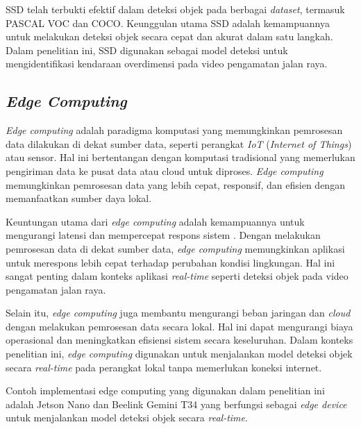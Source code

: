 SSD telah terbukti efektif dalam deteksi objek pada berbagai \emph{dataset}, termasuk PASCAL VOC dan COCO. Keunggulan utama SSD adalah kemampuannya untuk melakukan deteksi objek secara cepat dan akurat dalam satu langkah. Dalam penelitian ini, SSD digunakan sebagai model deteksi untuk mengidentifikasi kendaraan overdimensi pada video pengamatan jalan raya.

\subsection{\emph{Edge Computing}}

\emph{Edge computing} adalah paradigma komputasi yang memungkinkan pemrosesan data dilakukan di dekat sumber data, seperti perangkat \emph{IoT} (\emph{Internet of Things}) atau sensor. Hal ini bertentangan dengan komputasi tradisional yang memerlukan pengiriman data ke pusat data atau cloud untuk diproses. \emph{Edge computing} memungkinkan pemrosesan data yang lebih cepat, responsif, dan efisien dengan memanfaatkan sumber daya lokal.

Keuntungan utama dari \emph{edge computing} adalah kemampuannya untuk mengurangi latensi dan mempercepat respons sistem \parencite*{aws2024}. Dengan melakukan pemrosesan data di dekat sumber data, \emph{edge computing} memungkinkan aplikasi untuk merespons lebih cepat terhadap perubahan kondisi lingkungan. Hal ini sangat penting dalam konteks aplikasi \emph{real-time} seperti deteksi objek pada video pengamatan jalan raya.

Selain itu, \emph{edge computing} juga membantu mengurangi beban jaringan dan \emph{cloud} dengan melakukan pemrosesan data secara lokal. Hal ini dapat mengurangi biaya operasional dan meningkatkan efisiensi sistem secara keseluruhan. Dalam konteks penelitian ini, \emph{edge computing} digunakan untuk menjalankan model deteksi objek secara \emph{real-time} pada perangkat lokal tanpa memerlukan koneksi internet. 

Contoh implementasi edge computing yang digunakan dalam penelitian ini adalah Jetson Nano dan Beelink Gemini T34 yang berfungsi sebagai \emph{edge device} untuk menjalankan model deteksi objek secara \emph{real-time}.

